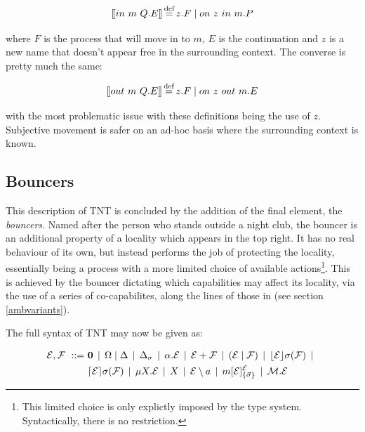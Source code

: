 \begin{equation}
[\hspace{-0.3ex}[ in\ m\ Q.E ]\hspace{-0.3ex}] \operatorname{\stackrel{\textrm{def}}{=}} z.F \;|\; on\ z\ in\ m.P
\end{equation}

\noindent where $F$ is the process that will move in to $m$, $E$ is
the continuation and $z$ is a new name that doesn't appear free in the
surrounding context.  The converse is pretty much the same:

\begin{equation}
[\hspace{-0.3ex}[ out\ m\ Q.E ]\hspace{-0.3ex}] \operatorname{\stackrel{\textrm{def}}{=}} z.F \;|\; on\ z\ out\ m.E
\end{equation}

\noindent with the most problematic issue with these definitions being
the use of $z$.  Subjective movement is safer on an ad-hoc basis where
the surrounding context is known.

\subsection{Bouncers}
\label{bouncers}

This description of TNT is concluded by the addition of the final
element, the \emph{bouncers}.  Named after the person who stands outside
a night club, the bouncer is an additional property of a locality which
appears in the top right.  It has no real behaviour of its own, but
instead performs the job of protecting the locality, essentially being a
process with a more limited choice of available actions\footnote{This
limited choice is only explictly imposed by the type system.
Syntactically, there is no restriction.}.  This is achieved by the
bouncer dictating which capabilities may affect its locality, via the
use of a series of co-capabilites, along the lines of those in
\cite{sangiorgi:mobsafeambients} (see section \ref{ambvariants}).

The full syntax of TNT may now be given as:

\begin{equation}
  \begin{aligned}
    \text{$\mathcal{E}$}, \text{$\mathcal{F}$} \ ::=\ &
    \textbf{0}  \;\,|\,\; 
    \Omega \;|\;
    \Delta \;\,|\,\; 
    \Delta_{\sigma} \;\,|\,\; 
    \alpha . \text{$\mathcal{E}$}  \;\,|\,\;
    \text{$\mathcal{E}$} + \text{$\mathcal{F}$} \;\,|\,\; 
    (\text{$\mathcal{E}$}\;|\;\text{$\mathcal{F}$})\;\,|\,\; 
    \lfloor{\text{$\mathcal{E}$}}\rfloor {\sigma} ({\text{$\mathcal{F}$}}) \;\,|\,\; \\
    & \lceil{\text{$\mathcal{E}$}}\rceil {\sigma} ({\text{$\mathcal{F}$}}) \;\,|\,\; 
    \mu X . \text{$\mathcal{E}$} \;\,|\,\; 
    X \;\,|\,\; 
    \text{$\mathcal{E}$} \setminus a \;\,|\,\; 
    {m}[ \text{$\mathcal{E}$} ]^{\text{$\mathcal{E}$}}_{\{\vec{\sigma}\}} \;\,|\,\;
    \text{$\mathcal{M}$} . \text{$\mathcal{E}$}
  \end{aligned}
\end{equation}


